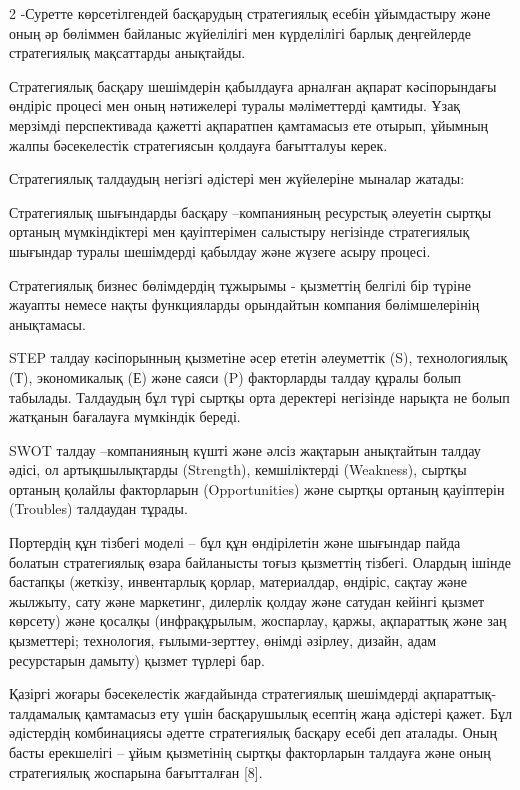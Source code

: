 \begin{multicols}{2}
2 -Суретте көрсетілгендей басқарудың стратегиялық есебін ұйымдастыру
және оның әр бөліммен байланыс жүйелілігі мен күрделілігі барлық
деңгейлерде стратегиялық мақсаттарды анықтайды.

Стратегиялық басқару шешімдерін қабылдауға арналған ақпарат
кәсіпорындағы өндіріс процесі мен оның нәтижелері туралы мәліметтерді
қамтиды. Ұзақ мерзімді перспективада қажетті ақпаратпен қамтамасыз ете
отырып, ұйымның жалпы бәсекелестік стратегиясын қолдауға бағытталуы
керек.

Стратегиялық талдаудың негізгі әдістері мен жүйелеріне мыналар жатады:

Стратегиялық шығындарды басқару --компанияның ресурстық әлеуетін сыртқы
ортаның мүмкіндіктері мен қауіптерімен салыстыру негізінде стратегиялық
шығындар туралы шешімдерді қабылдау және жүзеге асыру процесі.

Стратегиялық бизнес бөлімдердің тұжырымы - қызметтің белгілі бір түріне
жауапты немесе нақты функцияларды орындайтын компания бөлімшелерінің
анықтамасы.

STEP талдау кәсіпорынның қызметіне әсер ететін әлеуметтік (S),
технологиялық (Т), экономикалық (Е) және саяси (P) факторларды талдау
құралы болып табылады. Талдаудың бұл түрі сыртқы орта деректері
негізінде нарықта не болып жатқанын бағалауға мүмкіндік береді.

SWOT талдау --компанияның күшті және әлсіз жақтарын анықтайтын талдау
әдісі, ол артықшылықтарды (Strength), кемшіліктерді (Weakness), сыртқы
ортаның қолайлы факторларын (Opportunities) және сыртқы ортаның
қауіптерін (Troubles) талдаудан тұрады.

Портердің құн тізбегі моделі -- бұл құн өндірілетін және шығындар пайда
болатын стратегиялық өзара байланысты тоғыз қызметтің тізбегі. Олардың
ішінде бастапқы (жеткізу, инвентарлық қорлар, материалдар, өндіріс,
сақтау және жылжыту, сату және маркетинг, дилерлік қолдау және сатудан
кейінгі қызмет көрсету) және қосалқы (инфрақұрылым, жоспарлау, қаржы,
ақпараттық және заң қызметтері; технология, ғылыми-зерттеу, өнімді
әзірлеу, дизайн, адам ресурстарын дамыту) қызмет түрлері бар.

Қазіргі жоғары бәсекелестік жағдайында стратегиялық шешімдерді
ақпараттық-талдамалық қамтамасыз ету үшін басқарушылық есептің жаңа
әдістері қажет. Бұл әдістердің комбинациясы әдетте стратегиялық басқару
есебі деп аталады. Оның басты ерекшелігі -- ұйым қызметінің сыртқы
факторларын талдауға және оның стратегиялық жоспарына бағытталған
{[}8{]}.


\end{multicols}
